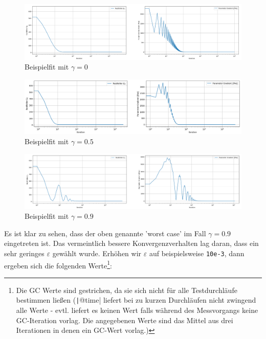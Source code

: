 \documentclass{article}
\theoremstyle{plain} %
\theoremstyle{definition} %
\begin{document}
\begin{figure}[H]
  \centering
  \includegraphics[width=\textwidth]{Momentum_0_0_Error_10e-12_Crop}
  \caption{Beispielfit mit $\gamma=0$}
\end{figure}
\begin{figure}[H]
  \centering
  \includegraphics[width=\textwidth]{Momentum_0_5_Error_10e-12_Crop}
  \caption{Beispielfit mit $\gamma=0.5$}
\end{figure}
\begin{figure}[H]
  \centering
  \includegraphics[width=\textwidth]{Momentum_0_9_Error_10e-12_Crop}
  \caption{Beispielfit mit $\gamma=0.9$}
\end{figure}

Es ist klar zu sehen, dass der oben genannte 'worst case' im Fall $\gamma=0.9$ eingetreten ist. Das vermeintlich bessere Konvergenzverhalten lag daran, dass ein sehr geringes $\varepsilon$ gewählt wurde. Erhöhen wir $\varepsilon$ auf beispielsweise \texttt{10e-3}, dann ergeben sich die folgenden Werte\footnote{Die GC Werte sind gestrichen, da sie sich nicht für alle Testdurchläufe bestimmen  ließen (\texttt|@time| liefert bei zu kurzen Durchläufen nicht zwingend alle Werte - evtl. liefert es keinen Wert falls während des Messvorgangs keine GC-Iteration vorlag. Die angegebenen Werte sind das Mittel aus drei Iterationen in denen ein GC-Wert vorlag.)}:
\end{document}
